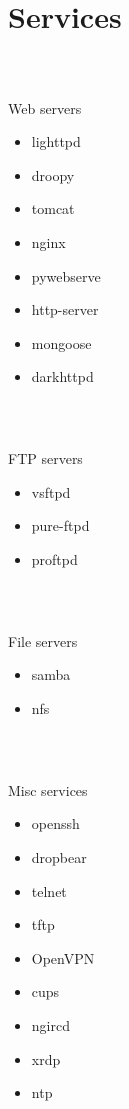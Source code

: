\section{Services}
%
\begin{frame}
\frametitle{\\}
%
{\LARGE Web servers \newline}
\begin{itemize}
  \item lighttpd
  \item droopy
  \item tomcat
  \item nginx
  \item pywebserve
  \item http-server
  \item mongoose
  \item darkhttpd
\end{itemize}
\end{frame}
%
\begin{frame}
\frametitle{\\}
%
{\LARGE FTP servers \newline}
\begin{itemize}
  \item vsftpd
  \item pure-ftpd
  \item proftpd
\end{itemize}
\end{frame}
%
\begin{frame}
\frametitle{\\}
%
{\LARGE File servers \newline}
\begin{itemize}
  \item samba
  \item nfs
\end{itemize}
\end{frame}
%
\begin{frame}
\frametitle{\\}
%
{\LARGE Misc services \newline}
\begin{itemize}
  \item openssh
  \item dropbear
  \item telnet
  \item tftp
  \item OpenVPN
  \item cups
  \item ngircd
  \item xrdp
  \item ntp
\end{itemize}
\end{frame}
